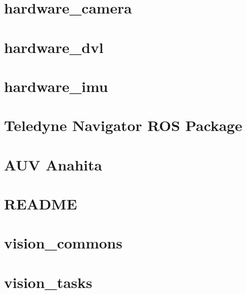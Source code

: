 \let\mypdfximage\pdfximage\def\pdfximage{\immediate\mypdfximage}\documentclass[twoside]{book}
\newcommand{\+}{\discretionary{\mbox{\scriptsize$\hookleftarrow$}}{}{}}
\begin{document}
\chapter{hardware\+\_\+camera}
\label{md_hardware_layer_hardware_camera_README}

\chapter{hardware\+\_\+dvl}
\label{md_hardware_layer_hardware_dvl_ethernet_README}

\chapter{hardware\+\_\+imu}
\label{md_hardware_layer_hardware_imu_README}

\chapter{Teledyne Navigator R\+OS Package}
\label{md_hardware_layer_teledyne_navigator_README}

\chapter{A\+UV Anahita}
\label{md_README}

\chapter{R\+E\+A\+D\+ME}
\label{md_vision_layer_image_undistort_README}

\chapter{vision\+\_\+commons}
\label{md_vision_layer_vision_commons_README}

\chapter{vision\+\_\+tasks}
\label{md_vision_layer_vision_tasks_README}

\end{document}

